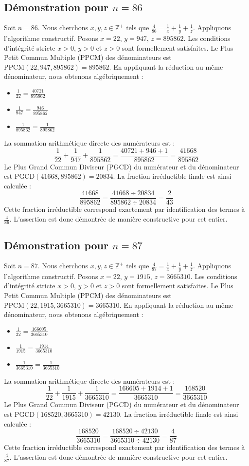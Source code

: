 \documentclass[11pt,a4paper]{article}
\begin{document}
\subsection{Démonstration pour $n = 86$}
Soit $n = 86$. Nous cherchons $x, y, z \in \mathbb{Z}^{+}$ tels que $\frac{4}{86} = \frac{1}{x} + \frac{1}{y} + \frac{1}{z}$.
Appliquons l'algorithme constructif. Posons $x = 22$, $y = 947$, $z = 895862$.
Les conditions d'intégrité stricte $x > 0$, $y > 0$ et $z > 0$ sont formellement satisfaites.
Le Plus Petit Commun Multiple (PPCM) des dénominateurs est $\text{PPCM}(22, 947, 895862) = 895862$.
En appliquant la réduction au même dénominateur, nous obtenons algébriquement :
\begin{itemize}
    \item $\frac{1}{22} = \frac{40721}{895862}$
    \item $\frac{1}{947} = \frac{946}{895862}$
    \item $\frac{1}{895862} = \frac{1}{895862}$
\end{itemize}
La sommation arithmétique directe des numérateurs est :
$$ \frac{1}{22} + \frac{1}{947} + \frac{1}{895862} = \frac{40721 + 946 + 1}{895862} = \frac{41668}{895862} $$
Le Plus Grand Commun Diviseur (PGCD) du numérateur et du dénominateur est $\text{PGCD}(41668, 895862) = 20834$.
La fraction irréductible finale est ainsi calculée :
$$ \frac{41668}{895862} = \frac{41668 \div 20834}{895862 \div 20834} = \frac{2}{43} $$
Cette fraction irréductible correspond exactement par identification des termes à $\frac{4}{86}$. L'assertion est donc démontrée de manière constructive pour cet entier.

\subsection{Démonstration pour $n = 87$}
Soit $n = 87$. Nous cherchons $x, y, z \in \mathbb{Z}^{+}$ tels que $\frac{4}{87} = \frac{1}{x} + \frac{1}{y} + \frac{1}{z}$.
Appliquons l'algorithme constructif. Posons $x = 22$, $y = 1915$, $z = 3665310$.
Les conditions d'intégrité stricte $x > 0$, $y > 0$ et $z > 0$ sont formellement satisfaites.
Le Plus Petit Commun Multiple (PPCM) des dénominateurs est $\text{PPCM}(22, 1915, 3665310) = 3665310$.
En appliquant la réduction au même dénominateur, nous obtenons algébriquement :
\begin{itemize}
    \item $\frac{1}{22} = \frac{166605}{3665310}$
    \item $\frac{1}{1915} = \frac{1914}{3665310}$
    \item $\frac{1}{3665310} = \frac{1}{3665310}$
\end{itemize}
La sommation arithmétique directe des numérateurs est :
$$ \frac{1}{22} + \frac{1}{1915} + \frac{1}{3665310} = \frac{166605 + 1914 + 1}{3665310} = \frac{168520}{3665310} $$
Le Plus Grand Commun Diviseur (PGCD) du numérateur et du dénominateur est $\text{PGCD}(168520, 3665310) = 42130$.
La fraction irréductible finale est ainsi calculée :
$$ \frac{168520}{3665310} = \frac{168520 \div 42130}{3665310 \div 42130} = \frac{4}{87} $$
Cette fraction irréductible correspond exactement par identification des termes à $\frac{4}{87}$. L'assertion est donc démontrée de manière constructive pour cet entier.
\end{document}
